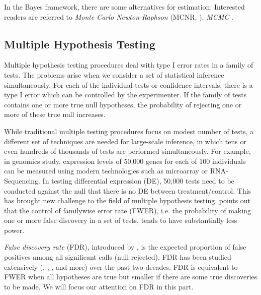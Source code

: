 	In the Bayes framework, there are some alternatives for estimation. Interested readers are referred to \textit{Monte Carlo Newton-Raphson} (MCNR, \cite{mcculloch1997maximum}), \textit{MCMC} \citep{hadfield2010mcmc}.


	\subsection{Multiple Hypothesis Testing}
	Multiple hypothesis testing procedures deal with type I error rates in a family of tests. The problems arise when we consider a set of statistical inference simultaneously.  For each of the individual tests or confidence intervals, there is a type I error which can be controlled by the experimenter.  If the family of tests contains one or more true null hypotheses, the probability of rejecting one or more of these true null increases. 
	
	While traditional multiple testing procedures focus on modest number of tests, a different set of techniques are needed for large-scale inference, in which tens or even hundreds of thousands of tests are performed simultaneously. For example, in genomics study, expression levels of 50,000 genes for each of 100 individuals can be measured using modern technologies such as microarray or RNA-Sequencing. In testing differential expression (DE), 50,000 tests need to be conducted against the null that there is no DE between treatment/control. This has brought new challenge to the field of multiple hypothesis testing. \cite{benjamini1995controlling} points out that the control of familywise error rate (FWER), i.e. the probability of making one or more false discovery in a set of tests, tends to have substantially less power. 
	
	\textit{False discovery rate} (FDR), introduced by \cite{benjamini1995controlling}, is the expected proportion of false positives among all significant calls (null rejected). FDR has been studied extensively (\cite{benjamini2001control}, \cite{storey2003statistical}, \cite{efron2004large}, \cite{efron2010large} and more) over the past two decades.  FDR is equivalent to FWER \citep{benjamini1995controlling} when all hypotheses are true but smaller if there are some true discoveries to be made. We will focus our attention on FDR in this part. 
	
